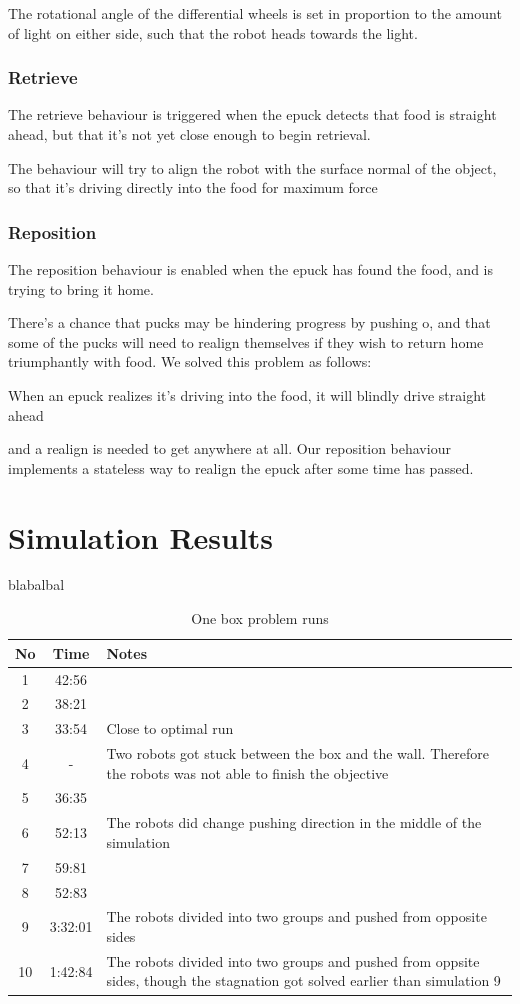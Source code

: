 \documentclass[a4paper]{article}
\begin{document}
The rotational angle of the differential wheels is set in proportion to the amount of light on either side, such that the robot heads towards the light.

\subsubsection{Retrieve}
The retrieve behaviour is triggered when the epuck detects that food is straight ahead, but that it's not yet close enough to begin retrieval.

The behaviour will try to align the robot with the surface normal of the object, so that it's driving directly into the food for maximum force

\subsubsection{Reposition}
The reposition behaviour is enabled when the epuck has found the food, and is trying to bring it home.

There's a chance that pucks may be hindering progress by pushing o, and that some of the pucks will need to realign themselves if they wish to return home triumphantly with food.
We solved this problem as follows:

When an epuck realizes it's driving into the food, it will blindly drive straight ahead


 and a realign is needed to get anywhere at all.
 Our reposition behaviour implements a stateless way to realign the epuck after some time has passed.

\section{Simulation Results}
blabalbal
\begin{table}[H]
\centering
\begin{tabular}{ c | c | p{5cm}}
\hline No & Time & Notes \\ \hline
 1 & 42:56 &  \\ \hline
 2 & 38:21 & \\ \hline
 3 & 33:54 & Close to optimal run \\ \hline
4 & - & Two robots got stuck between the box and the wall. Therefore the robots was not able to finish the objective \\ \hline
5 & 36:35 & \\ \hline
6	& 52:13 & The robots did change pushing direction in the middle of the simulation \\ \hline
7 & 59:81 & \\ \hline
8 & 52:83 & \\ \hline
9 & 3:32:01 &  The robots divided into two groups and pushed from opposite sides \\ \hline
10 & 1:42:84 & The robots divided into two groups and pushed from oppsite sides, though the stagnation got solved earlier than simulation 9 \\
\end{tabular}
\caption{One box problem runs}
\end{table}
\end{document}
